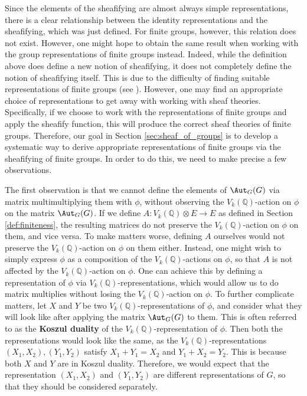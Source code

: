 \documentclass[a4paper,reqno,oneside]{article}
\begin{document}
Since the elements of the sheafifying are almost always simple representations, there is a clear relationship between the identity representations and the sheafifying, which was just defined. For finite groups, however, this relation does not exist. However, one might hope to obtain the same result when working with the group representations of finite groups instead. Indeed, while the definition above does define a new notion of sheafifying, it does not completely define the notion of sheafifying itself. This is due to the difficulty of finding suitable representations of finite groups (see \cite{Bourke1967}). However, one may find an appropriate choice of representations to get away with working with sheaf theories. Specifically, if we choose to work with the representations of finite groups and apply the sheafify function, this will produce the correct sheaf theories of finite groups. Therefore, our goal in Section \ref{sec:sheaf_of_groups} is to develop a systematic way to derive appropriate representations of finite groups via the sheafifying of finite groups. In order to do this, we need to make precise a few observations. 

The first observation is that we cannot define the elements of $\Aut_{G}(G)$ via matrix multimultiplying them with $\phi$, without observing the $V_k(\mathbb{Q})$-action on $\phi$ on the matrix $\Aut_{G}(G)$. If we define $A: V_k(\mathbb{Q}) \otimes E \to E$ as defined in Section \ref{def:finiteness}, the resulting matrices do not preserve the $V_k(\mathbb{Q})$-action on $\phi$ on them, and vice versa. To make matters worse, defining $A$ ourselves would not preserve the $V_k(\mathbb{Q})$-action on $\phi$ on them either. Instead, one might wish to simply express $\phi$ as a composition of the $V_k(\mathbb{Q})$-actions on $\phi$, so that $A$ is not affected by the $V_k(\mathbb{Q})$-action on $\phi$. One can achieve this by defining a representation of $\phi$ via $V_k(\mathbb{Q})$-representations, which would allow us to do matrix multiplies without losing the $V_k(\mathbb{Q})$-action on $\phi$. To further complicate matters, let $X$ and $Y$ be two $V_k(\mathbb{Q})$-representations of $\phi$, and consider what they will look like after applying the matrix $\Aut_{G}(G)$ to them. This is often referred to as the \textbf{Koszul duality} of the $V_k(\mathbb{Q})$-representation of $\phi$. Then both the representations would look like the same, as the $V_k(\mathbb{Q})$-representations $(X_{1}, X_{2}), (Y_{1}, Y_{2})$ satisfy $X_{1} + Y_{1} = X_{2}$ and $Y_{1} + X_{2} = Y_{2}$. This is because both $X$ and $Y$ are in Koszul duality. Therefore, we would expect that the representation $(X_{1}, X_{2})$ and $(Y_{1}, Y_{2})$ are different representations of $G$, so that they should be considered separately. 
\end{document}
